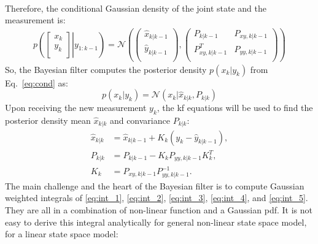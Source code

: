 \documentclass[12pt]{article}
\begin{document}
\begin{enumerate}[label=\arabic*)]
\begin{subequations}
\begin{align}
        \end{align}
        \end{subequations}
        Therefore, the conditional Gaussian density of the joint state and the measurement is:
        \begin{align} \label{eq:cond}
            p \left( \left[ \left. {\begin{array}{c}
                x_k \\
                y_k \\
            \end{array} } \right] \right| y_{1:k-1}  \right) =
            \mathcal{N} \left( \left( {\begin{array}{c}
                \hat x_{k|k-1} \\
                \hat y_{k|k-1} \\
            \end{array} } \right), 
            \left( {\begin{array}{cc}
                P_{k|k-1} & P_{xy,k|k-1} \\
                P^T_{xy,k|k-1} & P_{yy,k|k-1} \\
            \end{array} } \right) \right)
        \end{align}
        So, the Bayesian filter computes the posterior density $p(x_k|y_k)$ from Eq.~\eqref{eq:cond} as:
        \begin{equation} \label{eq:meas}
            p(x_k|y_k) = \mathcal{N} (x_k|\hat x_{k|k}, P_{k|k})
        \end{equation}
        Upon receiving the new measurement $y_k$, the \acrshort{kf} equations will be used to find the posterior density mean $\hat{x}_{k|k}$ and convariance $P_{k|k}$:
        \begin{subequations} \label{eq:kf}
        \begin{align}
            \hat x_{k|k} &= \hat x_{k|k-1} + K_k (y_k - \hat y_{k|k-1}), \\
            P_{k|k} &= P_{k|k-1} - K_k P_{yy,k|k-1} K_k^T, \\
            K_k &= P_{xy,k|k-1} P^{-1}_{yy,k|k-1}.
        \end{align}
        \end{subequations}
        The main challenge and the heart of the Bayesian filter is to compute Gaussian weighted integrals of \eqref{eq:int_1}, \eqref{eq:int_2}, \eqref{eq:int_3}, \eqref{eq:int_4}, and \eqref{eq:int_5}. They are all in a combination of non-linear function and a Gaussian \acrshort{pdf}. It is not easy to derive this integral analytically for general non-linear state space model, for a linear state space model:

\end{enumerate}
\end{document}
